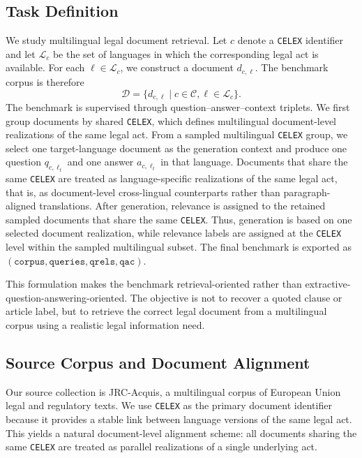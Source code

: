 \subsection{Task Definition}

We study multilingual legal document retrieval. Let \(c\) denote a \texttt{CELEX} identifier and let \(\mathcal{L}_c\) be the set of languages in which the corresponding legal act is available. For each \(\ell \in \mathcal{L}_c\), we construct a document \(d_{c,\ell}\). The benchmark corpus is therefore
\[
\mathcal{D} = \{ d_{c,\ell} \mid c \in \mathcal{C}, \ell \in \mathcal{L}_c \}.
\]
The benchmark is supervised through question--answer--context triplets. We first group documents by shared \texttt{CELEX}, which defines multilingual document-level realizations of the same legal act. From a sampled multilingual \texttt{CELEX} group, we select one target-language document as the generation context and produce one question \(q_{c,\ell_t}\) and one answer \(a_{c,\ell_t}\) in that language. Documents that share the same \texttt{CELEX} are treated as language-specific realizations of the same legal act, that is, as document-level cross-lingual counterparts rather than paragraph-aligned translations. After generation, relevance is assigned to the retained sampled documents that share the same \texttt{CELEX}. Thus, generation is based on one selected document realization, while relevance labels are assigned at the \texttt{CELEX} level within the sampled multilingual subset. The final benchmark is exported as \((\texttt{corpus}, \texttt{queries}, \texttt{qrels}, \texttt{qac})\).

This formulation makes the benchmark retrieval-oriented rather than extractive-question-answering-oriented. The objective is not to recover a quoted clause or article label, but to retrieve the correct legal document from a multilingual corpus using a realistic legal information need.

\subsection{Source Corpus and Document Alignment}

Our source collection is JRC-Acquis, a multilingual corpus of European Union legal and regulatory texts. We use \texttt{CELEX} as the primary document identifier because it provides a stable link between language versions of the same legal act. This yields a natural document-level alignment scheme: all documents sharing the same \texttt{CELEX} are treated as parallel realizations of a single underlying act.

